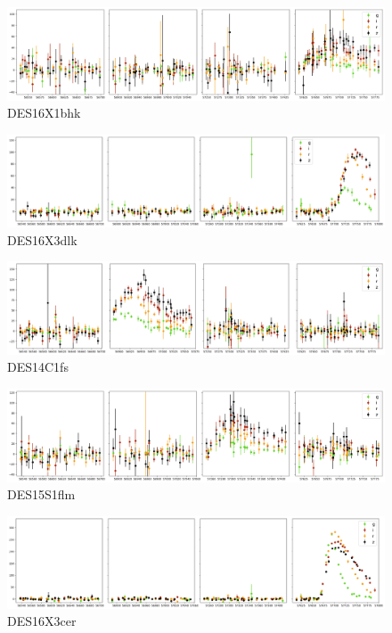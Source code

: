 \begin{figure}[H]
  \centering
  \includegraphics[width=\textwidth]{Figures/Appendix/CNN/1434194.png}
  \caption{DES16X1bhk}
\end{figure}

\begin{figure}[H]
  \centering
  \includegraphics[width=\textwidth]{Figures/Appendix/CNN/1530176.png}
  \caption{DES16X3dlk}
\end{figure}

\begin{figure}[H]
  \centering
  \includegraphics[width=\textwidth]{Figures/Appendix/CNN/1290941.png}
  \caption{DES14C1fs}
\end{figure}

\begin{figure}[H]
  \centering
  \includegraphics[width=\textwidth]{Figures/Appendix/CNN/1306465.png}
  \caption{DES15S1flm}
\end{figure}

\begin{figure}[H]
    \centering
  \includegraphics[width=\textwidth]{Figures/Appendix/CNN/1483027.png}
  \caption{DES16X3cer}
\end{figure}
